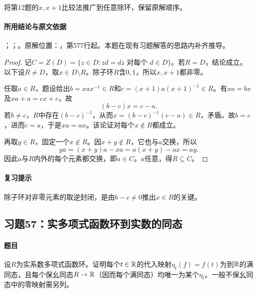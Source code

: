 将第12题的$x,x+1$比较法推广到任意除环，保留原解顺序。

\paragraph{所用结论与原文依据}

；；。原解位置：，第577行起。本题在现有习题解答的思路内补齐推导。


\begin{proof}

记$C=Z(D)=\{z\in D:zd=dz\text{ 对每个 }d\in D\}$。若$R=D$，结论成立。以下设$R\ne D$，取$x\in D\setminus R$。除子环$R$含$0,1$，所以$x,x+1$都非零。

任取$a\in R$，题设给出$b=xax^{-1}\in R$和$c=(x+1)a(x+1)^{-1}\in R$。有$xa=bx$及$xa+a=cx+c$，故
\[
(b-c)x=c-a.
\]
若$b\ne c$，$R$中存在$(b-c)^{-1}$，从而$x=(b-c)^{-1}(c-a)\in R$，矛盾。故$b=c$，进而$c=a$，于是$xa=ax$。该论证对每个$x\notin R$都成立。

再取$y\in R$，固定一个$x\notin R$。因$x+y\notin R$，它也与$a$交换，所以
\[
ya=(x+y)a-xa=a(x+y)-ax=ay.
\]
因此$a$与$R$内外的每个元素都交换，即$a\in C$。$a$任意，得$R\subseteq C$。

\end{proof}

\paragraph{复习提示}

除子环对非零元素的取逆封闭，是由$b-c\ne0$推出$x\in R$的关键。



\subsection{习题57：实多项式函数环到实数的同态}

\label{ex:3:57}

\paragraph{题目}

设$R$为实系数多项式函数环。证明每个$t\in\mathbb R$的代入映射$\eta_t(f)=f(t)$为到$\mathbb R$的满同态，且每个保幺同态$R\to\mathbb R$（因而每个满同态）均唯一为某个$\eta_t$。一般不保幺同态中的零映射需另列。

